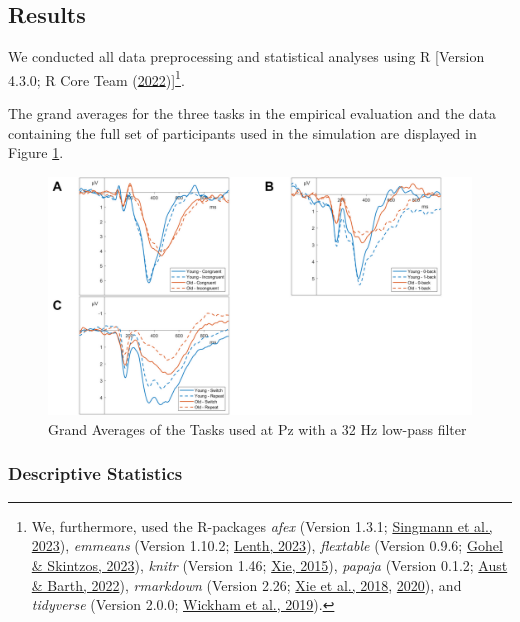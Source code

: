 \documentclass[
  man]{apa7}
\begin{document}
\hypertarget{results}{%
\subsection{Results}\label{results}}

We conducted all data preprocessing and statistical analyses using R {[}Version 4.3.0; R Core Team (\protect\hyperlink{ref-R-base}{2022}){]}\footnote{We, furthermore, used the R-packages \emph{afex} (Version 1.3.1; \protect\hyperlink{ref-R-afex}{Singmann et al., 2023}), \emph{emmeans} (Version 1.10.2; \protect\hyperlink{ref-R-emmeans}{Lenth, 2023}), \emph{flextable} (Version 0.9.6; \protect\hyperlink{ref-R-flextable}{Gohel \& Skintzos, 2023}), \emph{knitr} (Version 1.46; \protect\hyperlink{ref-R-knitr}{Xie, 2015}), \emph{papaja} (Version 0.1.2; \protect\hyperlink{ref-R-papaja}{Aust \& Barth, 2022}), \emph{rmarkdown} (Version 2.26; \protect\hyperlink{ref-R-rmarkdown_a}{Xie et al., 2018}, \protect\hyperlink{ref-R-rmarkdown_b}{2020}), and \emph{tidyverse} (Version 2.0.0; \protect\hyperlink{ref-R-tidyverse}{Wickham et al., 2019}).}.

The grand averages for the three tasks in the empirical evaluation and the data containing the full set of participants used in the simulation are displayed in Figure \ref{fig:grand-average-plots}.



\begin{figure}
\includegraphics[width=6.4in]{../images/arranged_img_ga} \caption{Grand Averages of the Tasks used at Pz with a 32 Hz low-pass filter}\label{fig:grand-average-plots}
\end{figure}

\hypertarget{descriptive-statistics}{%
\subsubsection{Descriptive Statistics}\label{descriptive-statistics}}
\end{document}
